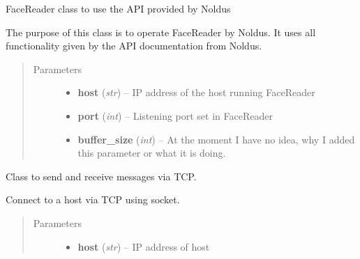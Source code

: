 \documentclass[letterpaper,10pt,english]{sphinxmanual}
\begin{document}
\begin{fulllineitems}
\label{_static/code:FaceReader.FaceReader}
FaceReader class to use the API provided by Noldus

The purpose of this class is to operate FaceReader by Noldus. It uses all functionality given by the API documentation from Noldus.
\begin{quote}\begin{description}
\item[{Parameters}] \leavevmode\begin{itemize}
\item {} 
\textbf{host} (\emph{str}) -- IP address of the host running FaceReader

\item {} 
\textbf{port} (\emph{int}) -- Listening port set in FaceReader

\item {} 
\textbf{buffer\_size} (\emph{int}) -- At the moment I have no idea, why I added this parameter or what it is doing.

\end{itemize}

\end{description}\end{quote}

\begin{fulllineitems}
\label{_static/code:FaceReader.FaceReader.MySocket}
Class to send and receive messages via TCP.

\begin{fulllineitems}
\label{_static/code:FaceReader.FaceReader.MySocket.connect}
Connect to a host via TCP using socket.
\begin{quote}\begin{description}
\item[{Parameters}] \leavevmode\begin{itemize}
\item {} 
\textbf{host} (\emph{str}) -- IP address of host


\end{itemize}
\end{description}
\end{quote}
\end{fulllineitems}
\end{fulllineitems}
\end{fulllineitems}
\end{document}
